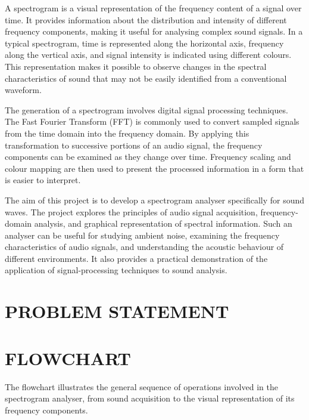 \documentclass[12pt,a4paper]{article}
\begin{document}
A spectrogram is a visual representation of the frequency content of a signal over time. It provides information about the distribution and intensity of different frequency components, making it useful for analysing complex sound signals. In a typical spectrogram, time is represented along the horizontal axis, frequency along the vertical axis, and signal intensity is indicated using different colours. This representation makes it possible to observe changes in the spectral characteristics of sound that may not be easily identified from a conventional waveform.

The generation of a spectrogram involves digital signal processing techniques. The Fast Fourier Transform (FFT) is commonly used to convert sampled signals from the time domain into the frequency domain. By applying this transformation to successive portions of an audio signal, the frequency components can be examined as they change over time. Frequency scaling and colour mapping are then used to present the processed information in a form that is easier to interpret.

The aim of this project is to develop a spectrogram analyser specifically for sound waves. The project explores the principles of audio signal acquisition, frequency-domain analysis, and graphical representation of spectral information. Such an analyser can be useful for studying ambient noise, examining the frequency characteristics of audio signals, and understanding the acoustic behaviour of different environments. It also provides a practical demonstration of the application of signal-processing techniques to sound analysis.
\newpage
\section*{\textbf{PROBLEM STATEMENT}}

\section*{\textbf{FLOWCHART}}

The flowchart illustrates the general sequence of
operations involved in the spectrogram analyser,
from sound acquisition to the visual representation
of its frequency components.
\end{document}
